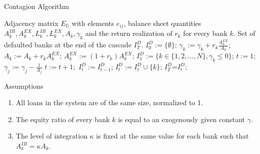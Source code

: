 \documentclass{beamer}
\begin{document}
\begin{appendix}
\begin{frame}{Contagion Algorithm}
	\tiny{
	\begin{algorithmic}[1]
		\REQUIRE Adjacency matrix $E_\mathbb{G}$ with elements $e_{ij}$, balance sheet quantities $A^{IB}_k, A^{EX}_k, L^{IB}_k, L^{EX}_k, A_k, \gamma_k$ and the return realization of $r_k$ for every bank $k$.
		\ENSURE Set of defaulted banks at the end of the cascade $I^{D}_T$.
		\STATE $I^D_0:=\{\emptyset\}$;	
		\STATE $\gamma_k:=\gamma_k + r_k\frac{A^{EX}_k}{A_k}$;	
		\STATE $A_k:=A_k + r_k A^{EX}_k$;
		\STATE $A^{EX}_k:=(1+r_k)A^{EX}_k$;
		\ENDFOR
		\STATE $I^D_1:=\{k\in\{1,2,\ldots,N\},\gamma_k\leq 0\}$;	
		\STATE $t:=1$;
		\STATE $\gamma_j:=\gamma_j-\frac{1}{A_j}$ 
		\ENDFOR
		\ENDFOR
		\STATE $t:=t+1;$	
		\STATE $I^D_{t}:=I^D_{t-1}$;
		\STATE $I^D_{t}:=I^D_{t} \cup \{k\}$;	
		\ENDIF
		\ENDFOR
		\ENDWHILE
		\STATE $I^D_T$=$I^D_t$;	
	\end{algorithmic}
}
\end{frame}

\begin{frame}{Assumptions}
	\begin{enumerate}
		\item All loans in the system are of the same size, normalized to 1.
		\item The equity ratio of every bank $k$ is equal to an exogenously given constant $\gamma$.
		\item The level of integration $\kappa$ is fixed at the same value for each bank such that $A_k^{IB}=\kappa A_k$.
	\end{enumerate}
\end{frame}

\end{appendix}
\end{document}

